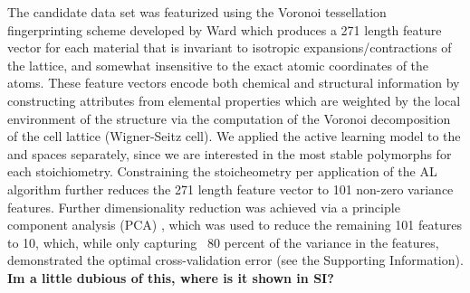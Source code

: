 %
%
The candidate data set was featurized using the Voronoi tessellation fingerprinting scheme developed by Ward  \cite{Ward2017} which produces a \num{271} length feature vector for each material that is invariant to isotropic expansions/contractions of the lattice, and somewhat insensitive to the exact atomic coordinates of the atoms.\cite{Ward2017}
%
These feature vectors encode both chemical and structural information by constructing attributes from elemental properties which are weighted by the local environment of the structure via the computation of the Voronoi decomposition of the cell lattice (Wigner-Seitz cell).
%
We applied the active learning model to the \IrOtwo and \IrOthree spaces separately, since we are interested in the most stable polymorphs for each stoichiometry.
%
Constraining the stoicheometry per application of the AL algorithm further reduces the \num{271} length  feature vector to \num{101} non-zero variance features.%
%
Further dimensionality reduction was achieved via a principle component analysis (PCA) \cite{Tipping1999}, which was used to reduce the remaining \num{101} features to \num{10}, which, while only capturing ~80 percent of the variance in the features, demonstrated the optimal cross-validation error (see the Supporting Information).  \textbf{Im a little dubious of this, where is it shown in SI?}

